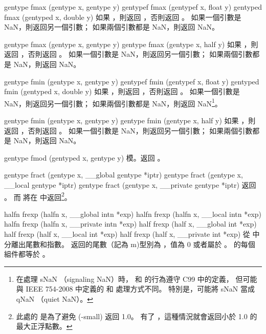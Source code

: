 gentype fmax (gentype x, gentype y)
gentypef fmax (gentypef x, float y)
gentyped fmax (gentyped x, double y)
\stopbuffer
{}
如果 ，則返回 ，否則返回 。
如果一個引數是 NaN，則返回另一個引數；
如果兩個引數都是 NaN，則返回 NaN。
\stopbuffer

gentype fmax (gentype x, gentype y)
gentype fmax (gentype x, half y)
\stopbuffer
{}
如果 ，則返回 ，否則返回 。
如果一個引數是 NaN，則返回另一個引數；
如果兩個引數都是 NaN，則返回 NaN。
\stopbuffer

gentype fmin (gentype x, gentype y)
gentypef fmin (gentypef x, float y)
gentyped fmin (gentyped x, double y)
\stopbuffer
{}
如果 ，則返回 ，否則返回 。
如果一個引數是 NaN，則返回另一個引數；
如果兩個引數都是 NaN，則返回 NaN\footnote{
在處理 sNaN （signaling NaN）時，  和  的行為遵守 C99 中的定義，
但可能與 IEEE 754-2008 中定義的  和  處理方式不同。
特別是，可能將 sNaN 當成 qNaN （quiet NaN）。}。
\stopbuffer

gentype fmin (gentype x, gentype y)
gentype fmin (gentype x, half y)
\stopbuffer
{}
如果 ，則返回 ，否則返回 。
如果一個引數是 NaN，則返回另一個引數；
如果兩個引數都是 NaN，則返回 NaN。
\stopbuffer

gentype fmod (gentyped x, gentype y)
\stopbuffer
{}
模。返回 。
\stopbuffer

gentype fract (gentype x,
	__global gentype *iptr)
gentype fract (gentype x,
	__local gentype *iptr)
gentype fract (gentype x,
	__private gentype *iptr)
\stopbuffer
{}
返回 。
而  將在  中返回\footnote{
此處的  是為了避免 (-small) 返回 1.0。
有了 ，這種情況就會返回小於 1.0 的最大正浮點數。}。
\stopbuffer

halfn frexp (halfn x,
	__global intn *exp)
halfn frexp (halfn x,
	__local intn *exp)
halfn frexp (halfn x,
	__private intn *exp)
half frexp (half x,
	__global int *exp)
half frexp (half x,
	__local int *exp)
half frexp (half x,
	__private int *exp)
\stopbuffer
{}
從  中分離出尾數和指數。
返回的尾數（記為 m)型別為 ，值為 0 或者屬於 \math{[1/2, 1)}。
 的每個組件都等於 。
\stopbuffer

